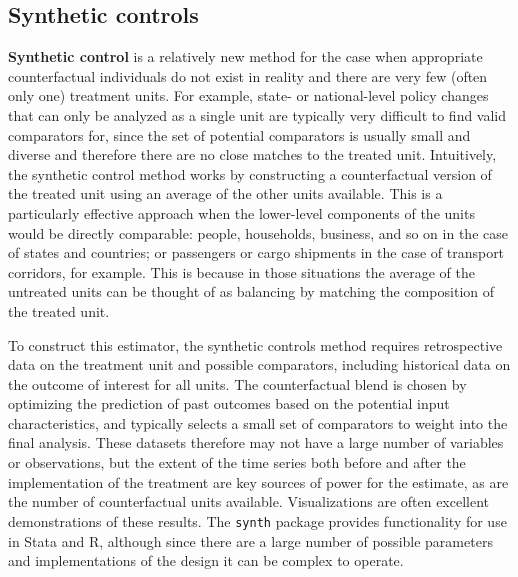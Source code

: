 \subsection{Synthetic controls}

\textbf{Synthetic control} is a relatively new method
for the case when appropriate counterfactual individuals
do not exist in reality and there are very few (often only one) treatment units.\cite{abadie2015comparative}
For example, state- or national-level policy changes
that can only be analyzed as a single unit
are typically very difficult to find valid comparators for,
since the set of potential comparators is usually small and diverse
and therefore there are no close matches to the treated unit.
Intuitively, the synthetic control method works
by constructing a counterfactual version of the treated unit
using an average of the other units available.\cite{abadie2010synthetic}
This is a particularly effective approach
when the lower-level components of the units would be directly comparable:
people, households, business, and so on in the case of states and countries;
or passengers or cargo shipments in the case of transport corridors, for example.\cite{gobillon2016regional}
This is because in those situations the average of the untreated units
can be thought of as balancing by matching the composition of the treated unit.

To construct this estimator, the synthetic controls method requires
retrospective data on the treatment unit and possible comparators,
including historical data on the outcome of interest for all units.
The counterfactual blend is chosen by optimizing the prediction of past outcomes
based on the potential input characteristics,
and typically selects a small set of comparators to weight into the final analysis.
These datasets therefore may not have a large number of variables or observations,
but the extent of the time series both before and after the implementation
of the treatment are key sources of power for the estimate,
as are the number of counterfactual units available.
Visualizations are often excellent demonstrations of these results.
The \texttt{synth} package provides functionality for use in Stata and R,
although since there are a large number of possible parameters
and implementations of the design it can be complex to operate.\cite{abadie2014synth}
